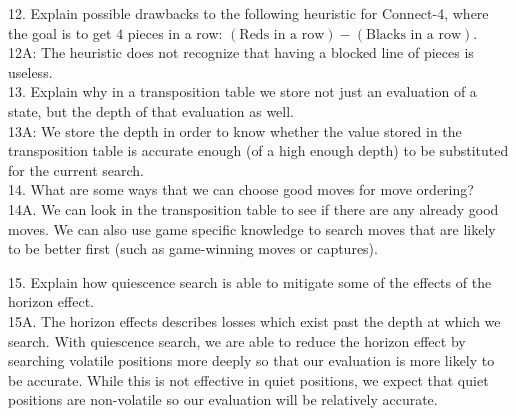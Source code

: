 \documentclass[12pt, letterpaper]{article}
\begin{document}
12. Explain possible drawbacks to the following heuristic for Connect-4, where the goal is to get $4$ pieces in a row: $(\text{Reds in a row}) - (\text{Blacks in a row})$. \\
12A: The heuristic does not recognize that having a blocked line of pieces is useless. \\

13. Explain why in a transposition table we store not just an evaluation of a state, but the depth of that evaluation as well. \\
13A: We store the depth in order to know whether the value stored in the transposition table is accurate enough (of a high enough depth) to be substituted for the current search. \\

14. What are some ways that we can choose good moves for move ordering? \\
14A. We can look in the transposition table to see if there are any already good moves. We can also use game specific knowledge to search moves that are likely to be better first (such as game-winning moves or captures).

15. Explain how quiescence search is able to mitigate some of the effects of the horizon effect.\\
15A. The horizon effects describes losses which exist past the depth at which we search. With quiescence search, we are able to reduce the horizon effect by searching volatile positions more deeply so that our evaluation is more likely to be accurate. While this is not effective in quiet positions, we expect that quiet positions are non-volatile so our evaluation will be relatively accurate.
\end{document}
